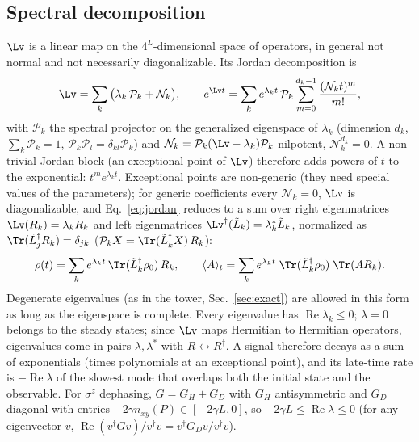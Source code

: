 \subsection{Spectral decomposition}
\label{sec:spectral}

$\Lv$ is a linear map on the $4^L$-dimensional space of operators, in general not normal and not necessarily diagonalizable. Its Jordan decomposition is
\begin{equation}
\Lv = \sum_k\big(\lambda_k\,\mathcal P_k + \mathcal N_k\big), \qquad
e^{\Lv t} = \sum_k e^{\lambda_k t}\,\mathcal P_k\sum_{m=0}^{d_k - 1}\frac{(\mathcal N_k t)^m}{m!},
\label{eq:jordan}
\end{equation}
with $\mathcal P_k$ the spectral projector on the generalized eigenspace of $\lambda_k$ (dimension $d_k$, $\sum_k\mathcal P_k = 1$, $\mathcal P_k\mathcal P_l = \delta_{kl}\mathcal P_k$) and $\mathcal N_k = \mathcal P_k(\Lv - \lambda_k)\mathcal P_k$ nilpotent, $\mathcal N_k^{d_k} = 0$. A non-trivial Jordan block (an exceptional point of $\Lv$) therefore adds powers of $t$ to the exponential: $t^m e^{\lambda_k t}$. Exceptional points are non-generic (they need special values of the parameters); for generic coefficients every $\mathcal N_k = 0$, $\Lv$ is diagonalizable, and Eq.~\eqref{eq:jordan} reduces to a sum over right eigenmatrices $\Lv(R_k) = \lambda_kR_k$ and left eigenmatrices $\Lv^\dagger(\tilde L_k) = \lambda_k^*\tilde L_k$, normalized as $\Tr(\tilde L_j^\dagger R_k) = \delta_{jk}$ ($\mathcal P_k X = \Tr(\tilde L_k^\dagger X)\,R_k$):
\begin{equation}
\rho(t) = \sum_k e^{\lambda_k t}\,\Tr(\tilde L_k^\dagger\rho_0)\,R_k, \qquad
\langle A\rangle_t = \sum_k e^{\lambda_k t}\;\Tr(\tilde L_k^\dagger\rho_0)\;\Tr(AR_k).
\label{eq:spectral}
\end{equation}
Degenerate eigenvalues (as in the tower, Sec.~\ref{sec:exact}) are allowed in this form as long as the eigenspace is complete. Every eigenvalue has $\operatorname{Re}\lambda_k \le 0$; $\lambda = 0$ belongs to the steady states; since $\Lv$ maps Hermitian to Hermitian operators, eigenvalues come in pairs $\lambda, \lambda^*$ with $R \leftrightarrow R^\dagger$. A signal therefore decays as a sum of exponentials (times polynomials at an exceptional point), and its late-time rate is $-\operatorname{Re}\lambda$ of the slowest mode that overlaps both the initial state and the observable. For $\sigma^z$ dephasing, $G = G_H + G_D$ with $G_H$ antisymmetric and $G_D$ diagonal with entries $-2\gamma n_{xy}(P) \in [-2\gamma L, 0]$, so $-2\gamma L \le \operatorname{Re}\lambda \le 0$ (for any eigenvector $v$, $\operatorname{Re}(v^\dagger Gv)/v^\dagger v = v^\dagger G_Dv/v^\dagger v$).

